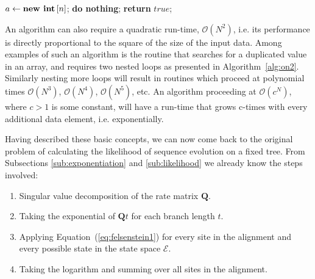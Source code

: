 \begin{algorithm}[H]
\centering
\begin{algorithmic}[1]
\State $a \gets \text{\textbf{new int}}\left[n\right]$;
%
%
%
%
\State \textbf{do nothing};
%
\Else 
%
%
\State \textbf{return} $true$;
%
\EndIf
%
\EndIf {}
%
\EndFor {}
%
\EndFor {}
\end{algorithmic}
\caption{
{ \footnotesize 
{\bf Search for a first duplicated value.} 
}%
}
\label{alg:on2}
\end{algorithm}

An algorithm can also require a quadratic run-time, $\mathcal{O}\left(N^2\right)$, i.e. its performance is directly proportional to the square of the size of the input data.
Among examples of such an algorithm is the routine that searches for a duplicated value in an array, and requires two nested loops as presented in Algorithm~\ref{alg:on2}.
Similarly nesting more loops will result in routines which proceed at polynomial times $\mathcal{O}\left(N^3\right)$, $\mathcal{O}\left(N^4\right)$, $\mathcal{O}\left(N^5\right)$, etc.
An algorithm proceeding at $\mathcal{O}\left(c^N\right)$, where $c>1$ is some constant, will have a run-time that grows c-times with every additional data element, i.e. exponentially. 

Having described these basic concepts, we can now come back to the original problem of calculating the likelihood of sequence evolution on a fixed tree.
From Subsections \ref{sub:exponentiation} and \ref{sub:likelihood} we already know the steps involved:

\begin{enumerate}
\item { Singular value decomposition of the rate matrix $\mathbf{Q}$. }
\item { Taking the exponential of $\mathbf{Q}t$ for each branch length $t$. }
\item { Applying Equation~(\ref{eq:felsenstein1}) for every site in the alignment and every possible state in the state space $\mathcal{E}$. }
\item { Taking the logarithm and summing over all sites in the alignment. }
\end{enumerate}

